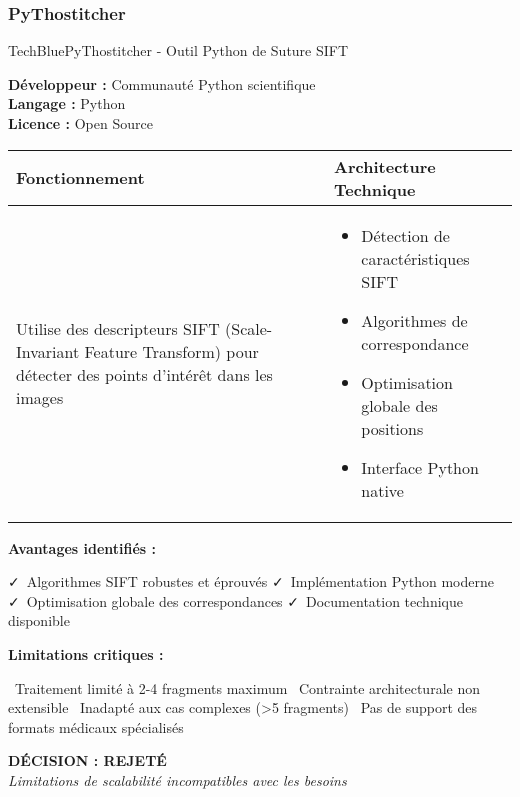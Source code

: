 \documentclass[12pt,a4paper]{report}
\newcommand{\pro}[1]{\textcolor{SuccessGreen}{\faCheck\ #1}}
\newcommand{\con}[1]{\textcolor{DangerRed}{\faTimes\ #1}}
\begin{document}
\begin{}
\begin{}
\begin{}
\begin{}
\subsubsection{PyThostitcher}

\begin{techbox}{TechBlue}{PyThostitcher - Outil Python de Suture SIFT}

\textbf{Développeur :} Communauté Python scientifique \\
\textbf{Langage :} Python \\
\textbf{Licence :} Open Source

\vspace{0.5cm}

\begin{tabularx}{\textwidth}{|X|X|}
\hline
\rowcolor{LightGray}
\textbf{Fonctionnement} & \textbf{Architecture Technique} \\
\hline
Utilise des descripteurs SIFT (Scale-Invariant Feature Transform) pour détecter des points d'intérêt dans les images & 
\begin{itemize}[nosep]
\item Détection de caractéristiques SIFT
\item Algorithmes de correspondance
\item Optimisation globale des positions
\item Interface Python native
\end{itemize} \\
\hline
\end{tabularx}

\vspace{0.5cm}

\textbf{Avantages identifiés :}
\begin{itemize}[leftmargin=*]
    \pro{Algorithmes SIFT robustes et éprouvés}
    \pro{Implémentation Python moderne}
    \pro{Optimisation globale des correspondances}
    \pro{Documentation technique disponible}
\end{itemize}

\textbf{Limitations critiques :}
\begin{itemize}[leftmargin=*]
    \con{Traitement limité à 2-4 fragments maximum}
    \con{Contrainte architecturale non extensible}
    \con{Inadapté aux cas complexes (>5 fragments)}
    \con{Pas de support des formats médicaux spécialisés}
\end{itemize}

\begin{center}
\textbf{\textcolor{DangerRed}{DÉCISION : REJETÉ}}\\
\textit{Limitations de scalabilité incompatibles avec les besoins}
\end{center}


\end{techbox}
\end{}
\end{}
\end{}
\end{}
\end{document}
